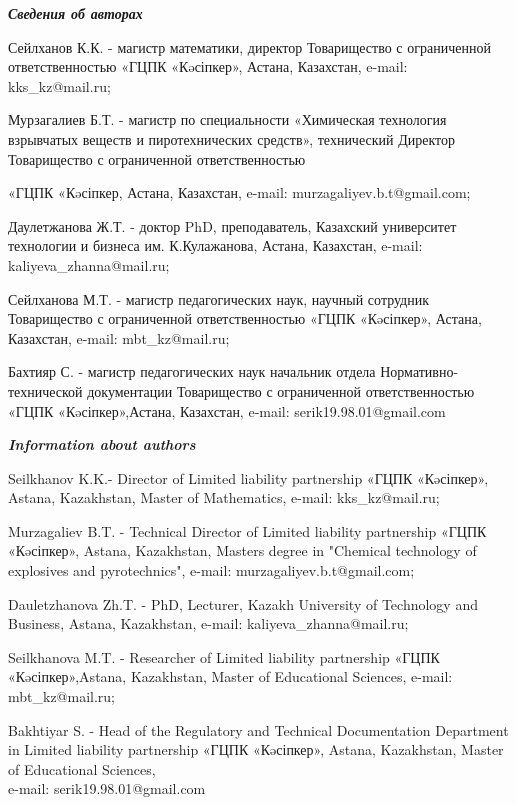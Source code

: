 \emph{{\bfseries Сведения об авторах}}

\begin{noparindent}
Сейлханов К.К. - магистр математики, директор Товарищество с
ограниченной ответственностью «ГЦПК «Кəсіпкер», Астана, Казахстан,
e-mail: kks\_kz@mail.ru;

Мурзагалиев Б.Т. - магистр по специальности
«Химическая технология взрывчатых веществ и пиротехнических средств»,
технический Директор Товарищество с ограниченной ответственностью

«ГЦПК «Кəсіпкер, Астана, Казахстан, e-mail:
murzagaliyev.b.t@gmail.com;

Даулетжанова Ж.Т. - доктор PhD, преподаватель, Казахский университет технологии и бизнеса им.
К.Кулажанова, Астана, Казахстан, e-mail: kaliyeva\_zhanna@mail.ru;

Сейлханова М.Т. - магистр педагогических наук, научный сотрудник
Товарищество с ограниченной ответственностью «ГЦПК «Кəсіпкер», Астана,
Казахстан, e-mail: mbt\_kz@mail.ru;

Бахтияр С. - магистр педагогических наук начальник отдела
Нормативно-технической документации Товарищество с ограниченной
ответственностью «ГЦПК «Кəсіпкер»,Астана, Казахстан, e-mail:
serik19.98.01@gmail.com
\end{noparindent}

\emph{{\bfseries Information about authors}}

\begin{noparindent}
Seilkhanov K.K.- Director of Limited liability partnership «ГЦПК
«Кəсіпкер», Astana, Kazakhstan, Master of Mathematics, e-mail:
kks\_kz@mail.ru;

Murzagaliev B.T. - Technical Director of Limited liability partnership
«ГЦПК «Кəсіпкер», Astana, Kazakhstan, Master\textquotesingle s degree in
"Chemical technology of explosives and pyrotechnics", e-mail:
murzagaliyev.b.t@gmail.com;

Dauletzhanova Zh.T. - PhD, Lecturer, Kazakh University of Technology and
Business, Astana, Kazakhstan, e-mail: kaliyeva\_zhanna@mail.ru;

Seilkhanova M.T. - Researcher of Limited liability partnership «ГЦПК
«Кəсіпкер»,Astana, Kazakhstan, Master of Educational Sciences, e-mail:
mbt\_kz@mail.ru;

Bakhtiyar S. - Head of the Regulatory and Technical Documentation
Department in Limited liability partnership «ГЦПК «Кəсіпкер», Astana,
Kazakhstan, Master of Educational Sciences,\\ e-mail:
serik19.98.01@gmail.com
\end{noparindent}
